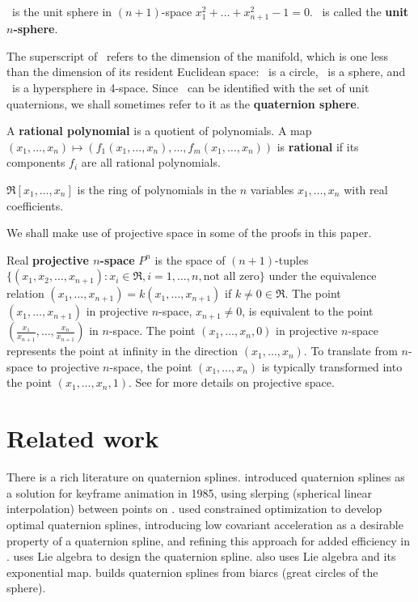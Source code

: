 \begin{defn2}
\ is the unit sphere in $(n+1)$-space $x_1^2 + \ldots + x_{n+1}^2 - 1 = 0$.
\ is called the {\bf unit $n$-sphere}.
\end{defn2}
%
The superscript of \Sn\ refers to the dimension of the manifold, which is one less
than the dimension of its resident Euclidean space:
\ is a circle, \ is a sphere, and \ is a hypersphere
in 4-space.
Since \ can be identified with the set of unit quaternions,
we shall sometimes refer to it as the {\bf quaternion sphere}.

\begin{defn2}
A {\bf rational polynomial} is a quotient of polynomials.
A map 
$(x_1,\ldots,x_n) \mapsto (f_1 (x_1,\ldots,x_n),\ldots,f_m (x_1,\ldots,x_n))$
is {\bf rational} if 
its components $f_i$ are all rational polynomials.
\end{defn2}

\begin{defn2}
$\Re[x_1,\ldots,x_n]$ is the ring of polynomials in the $n$ variables
$x_1,\ldots,x_n$ with real coefficients.
\end{defn2}

We shall make use of projective space in some of the proofs in this paper.

\begin{defn2}
\label{defn:projspace}
Real {\bf projective $n$-space} $P^n$ is the space of $(n+1)$-tuples
$\{ (x_1,x_2,\ldots,x_{n+1}) : x_i \in \Re, i=1,\ldots,n, \mbox{not all zero} \}$
under the equivalence relation $(x_1,\ldots,x_{n+1}) = k(x_1,\ldots,x_{n+1})$
if $k \neq 0 \in \Re$.
The point $(x_1,\ldots,x_{n+1})$ in projective $n$-space, $x_{n+1} \neq 0$,
is equivalent to the point $(\frac{x_1}{x_{n+1}},\ldots,\frac{x_n}{x_{n+1}})$
in $n$-space.
The point $(x_1,\ldots,x_n,0)$ in projective $n$-space represents the point
at infinity in the direction $(x_1,\ldots,x_n)$.
To translate from $n$-space to projective $n$-space, the point 
$(x_1,\ldots,x_n)$ is typically transformed into the point $(x_1,\ldots,x_n,1)$.
See \cite{harris92} for more details on projective space.
\end{defn2}

\section{Related work}
\label{sec:prevwork}

There is a rich literature on quaternion splines.
\cite{shoemake85} introduced quaternion splines as a solution
for keyframe animation in 1985, using slerping (spherical linear
interpolation) between points on .
\cite{barr92} used constrained optimization to develop optimal
quaternion splines, introducing low covariant acceleration
as a desirable property of a quaternion spline,
and refining this approach for added efficiency in \cite{rama97}.
\cite{park97} uses Lie algebra to design the quaternion spline.
\cite{kim95} also uses Lie algebra and its exponential map.
\cite{wang93} builds quaternion splines from biarcs 
(great circles of the sphere).

